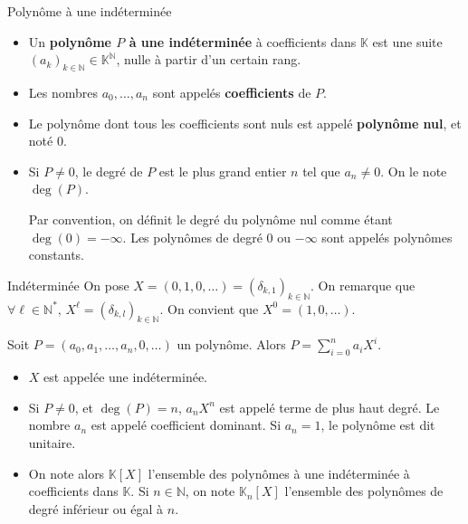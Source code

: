     \begin{defi}{Polynôme à une indéterminée}{}
        \begin{itemize}
            \item Un \textbf{polynôme $P$ à une indéterminée} à coefficients dans $\mathbb{K}$ est une suite $(a_k)_{k \in \mathbb{N}} \in \mathbb{K}^{\mathbb{N}}$, nulle à partir d’un certain rang.
            \item Les nombres $a_0,\ldots,a_n$ sont appelés \textbf{coefficients} de $P$.
            \item Le polynôme dont tous les coefficients sont nuls est appelé \textbf{polynôme nul}, et noté 0.
            \item Si $P \neq 0$, le degré de $P$ est le plus grand entier $n$ tel que $a_n \neq 0$. On le note $\deg(P)$. 
            
            Par convention, on définit le degré du polynôme nul comme étant $\deg(0) = -\infty$. Les polynômes de degré 0 ou $-\infty$ sont appelés polynômes constants.
        \end{itemize}
    \end{defi}

    \begin{defi}{Indéterminée}{}
        On pose $X = (0,1,0,\ldots) = (\delta_{k,1})_{k \in \mathbb{N}}$. On remarque que $ \forall \ell \in \mathbb{N}^*, \, X^{\ell} = (\delta_{k,l})_{k \in \mathbb{N}}$. On convient que $X^0 = (1,0,\ldots)$.

        Soit $P = (a_0, a_1, \ldots, a_n, 0, \ldots)$ un polynôme. Alors $P = \sum\limits_{i=0}^n a_i X^i$.

        \begin{itemize}
            \item $X$ est appelée une indéterminée.
            \item Si $P \neq 0$, et $\deg(P) = n$, $a_n X^n$ est appelé terme de plus haut degré. Le nombre $a_n$ est appelé coefficient dominant. \newline
            Si $a_n = 1$, le polynôme est dit unitaire.
            \item On note alors $\mathbb{K}[X]$ l’ensemble des polynômes à une indéterminée à coefficients dans $\mathbb{K}$. \newline
            Si $n \in \mathbb{N}$, on note $\mathbb{K}_n[X]$ l’ensemble des polynômes de degré inférieur ou égal à $n$.
        \end{itemize}
    \end{defi}

